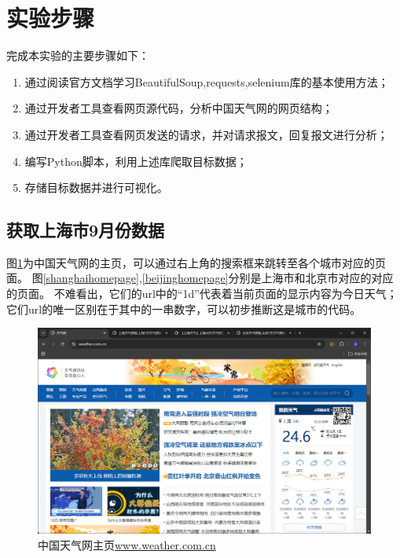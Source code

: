 \section{实验步骤}
完成本实验的主要步骤如下：
\begin{enumerate}
    \item 通过阅读官方文档学习BeautifulSoup,requests,selenium库的基本使用方法；
    \item 通过开发者工具查看网页源代码，分析中国天气网的网页结构；
    \item 通过开发者工具查看网页发送的请求，并对请求报文，回复报文进行分析；
    \item 编写Python脚本，利用上述库爬取目标数据；
    \item 存储目标数据并进行可视化。
\end{enumerate}
\subsection{获取上海市9月份数据}
图\ref{homepage}为中国天气网的主页，可以通过右上角的搜索框来跳转至各个城市对应的页面。
图\ref{shanghaihomepage},\ref{beijinghomepage}分别是上海市和北京市对应的对应的页面。
不难看出，它们的url中的“1d”代表着当前页面的显示内容为今日天气；它们url的唯一区别在于其中的一串数字，可以初步推断这是城市的代码。


\begin{figure}[!htbp]
    \centering
    \includegraphics[width=\textwidth]{figures/homepage.png}
    \caption{中国天气网主页\url{www.weather.com.cn}}\label{homepage}
\end{figure}

